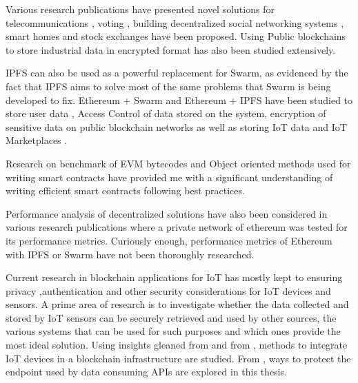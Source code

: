 \documentclass[11pt,openright]{report}
\begin{document}
Various research publications have presented novel solutions for telecommunications \cite{8441204}, voting \cite{8603050}, building decentralized social networking systems \cite{8645058}, smart homes\cite{8644880} and stock exchanges \cite{8516610} have been proposed. Using Public blockchains to store industrial data in encrypted format has also been studied extensively\cite{8622246}.

IPFS can also be used as a powerful replacement for Swarm, as evidenced by the fact that IPFS aims to solve most of the same problems that Swarm is being developed to fix. Ethereum + Swarm and Ethereum + IPFS have been studied to store user data \cite{8448350}, Access Control of data \cite{8400511} stored on the system, encryption of sensitive data on public blockchain networks \cite{8400511} as well as storing IoT data \cite{8634961} and IoT Marketplaces \cite{8525388}.

Research on benchmark of EVM bytecodes \cite{8612882} and Object oriented methods used for writing smart contracts \cite{8445056} have provided me with a significant understanding of writing efficient smart contracts following best practices. 

Performance analysis of decentralized solutions have also been considered in various research publications \cite{8342866} where a private network of ethereum was tested for its performance metrics. Curiously enough, performance metrics of Ethereum with IPFS or Swarm have not been thoroughly researched. 

Current research in blockchain applications for IoT has mostly kept to ensuring privacy ,authentication and other security considerations \cite{8012302} for IoT devices and sensors. A prime area of research is to investigate whether the data collected and stored by IoT sensors can be securely retrieved and used by other sources, the various systems that can be used for such purposes and which ones provide the most ideal solution. Using insights gleaned from \cite{8094378} and from \cite{8634961}, methods to integrate IoT devices in a blockchain infrastructure are studied. From  \cite{8644498}, ways to protect the endpoint used by data consuming APIs are explored in this thesis.
\end{document}
